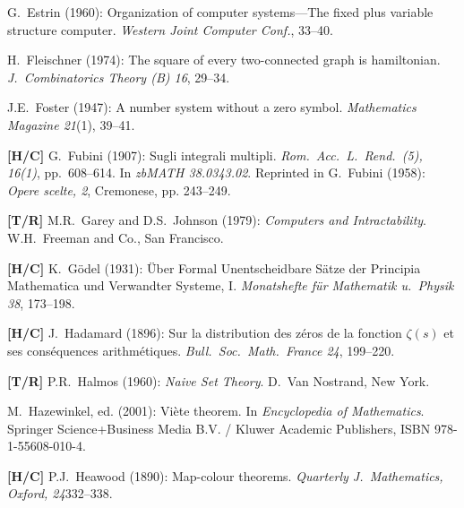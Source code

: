\begin{thebibliography}{999}

G.~Estrin (1960): Organization of computer systems---The fixed plus variable structure computer.
{\it Western Joint Computer Conf.}, 33--40.




H.~Fleischner (1974):  The square of every two-connected graph is hamiltonian.
{\it J.~Combinatorics Theory (B) 16}, 29--34.

J.E.~Foster (1947): A number system without a zero symbol.  {\it Mathematics Magazine 21}(1), 39--41.

{\bf [H/C]}
G.~Fubini (1907): Sugli integrali multipli.
{\it Rom.~Acc.~L.~Rend.~(5), 16(1)}, pp.~608--614.  In {\it zbMATH 38.0343.02}.  Reprinted in G.~Fubini (1958): {\it Opere scelte, 2}, Cremonese, pp. 243--249.



{\bf [T/R]}
M.R.~Garey and D.S.~Johnson (1979): {\it Computers and Intractability}.  W.H.~Freeman and Co., San Francisco.

{\bf [H/C]}
K.~G\"{o}del (1931): \"{U}ber Formal Unentscheidbare S\"{a}tze der Principia Mathematica und Verwandter Systeme, I.  {\it Monatshefte f\"{u}r Mathematik u.~Physik 38}, 173--198.



{\bf [H/C]}
J.~Hadamard (1896): Sur la distribution des z\'{e}ros de la fonction $\zeta(s)$ et ses cons\'{e}quences arithm\'{e}tiques.  {\it Bull.~Soc.~Math.~France 24}, 199--220.

{\bf [T/R]}
P.R.~Halmos (1960): {\it Naive Set Theory}.  D.~Van Nostrand, New York.

M.~Hazewinkel, ed. (2001): %
Vi\`{e}te theorem.  In {\it Encyclopedia of Mathematics}.
Springer Science+Business Media B.V. / Kluwer Academic Publishers,
ISBN 978-1-55608-010-4.

{\bf [H/C]}
P.J.~Heawood (1890): Map-colour theorems.  {\it Quarterly J.~Mathematics, Oxford, 24}332--338.


\end{thebibliography}
